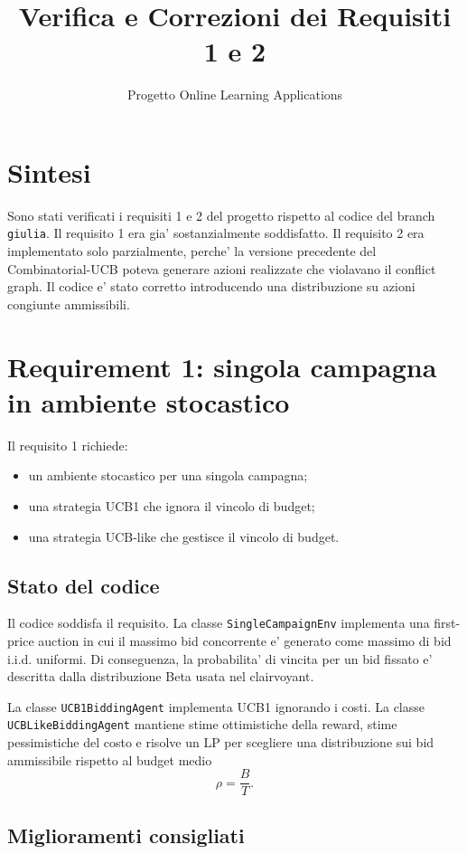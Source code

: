 \documentclass[11pt,a4paper]{article}
\title{Verifica e Correzioni dei Requisiti 1 e 2}
\author{Progetto Online Learning Applications}
\date{}
\begin{document}
\maketitle

\section{Sintesi}

Sono stati verificati i requisiti 1 e 2 del progetto rispetto al codice del
branch \texttt{giulia}. Il requisito 1 era gia' sostanzialmente soddisfatto. Il
requisito 2 era implementato solo parzialmente, perche' la versione precedente
del Combinatorial-UCB poteva generare azioni realizzate che violavano il conflict
graph. Il codice e' stato corretto introducendo una distribuzione su azioni
congiunte ammissibili.

\section{Requirement 1: singola campagna in ambiente stocastico}

Il requisito 1 richiede:
\begin{itemize}
  \item un ambiente stocastico per una singola campagna;
  \item una strategia UCB1 che ignora il vincolo di budget;
  \item una strategia UCB-like che gestisce il vincolo di budget.
\end{itemize}

\subsection{Stato del codice}

Il codice soddisfa il requisito. La classe \texttt{SingleCampaignEnv}
implementa una first-price auction in cui il massimo bid concorrente e' generato
come massimo di bid i.i.d. uniformi. Di conseguenza, la probabilita' di vincita
per un bid fissato e' descritta dalla distribuzione Beta usata nel clairvoyant.

La classe \texttt{UCB1BiddingAgent} implementa UCB1 ignorando i costi. La classe
\texttt{UCBLikeBiddingAgent} mantiene stime ottimistiche della reward, stime
pessimistiche del costo e risolve un LP per scegliere una distribuzione sui bid
ammissibile rispetto al budget medio
\[
  \rho = \frac{B}{T}.
\]

\subsection{Miglioramenti consigliati}
\end{document}
